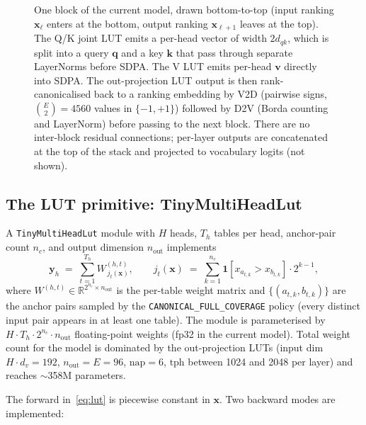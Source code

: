 \documentclass[11pt]{article}
\begin{document}
\begin{figure}[!t]
\caption{One block of the current model, drawn bottom-to-top (input ranking $\mathbf{x}_\ell$ enters at the bottom, output ranking $\mathbf{x}_{\ell+1}$ leaves at the top). The Q/K joint LUT emits a per-head vector of width $2 d_{qk}$, which is split into a query $\mathbf{q}$ and a key $\mathbf{k}$ that pass through separate LayerNorms before SDPA. The V LUT emits per-head $\mathbf{v}$ directly into SDPA. The out-projection LUT output is then rank-canonicalised back to a ranking embedding by V2D (pairwise signs, $\binom{E}{2} = 4560$ values in $\{-1, +1\}$) followed by D2V (Borda counting and LayerNorm) before passing to the next block. There are no inter-block residual connections; per-layer outputs are concatenated at the top of the stack and projected to vocabulary logits (not shown).}
\label{fig:block}
\end{figure}

\subsection{The LUT primitive: TinyMultiHeadLut}
\label{sec:current:tinymhl}

A \texttt{TinyMultiHeadLut} module with $H$ heads, $T_h$ tables per head, anchor-pair count $n_c$, and output dimension $n_{\text{out}}$ implements
\begin{equation}
    \mathbf{y}_h \;=\; \sum_{t=1}^{T_h} W^{(h, t)}_{\, j_t(\mathbf{x})}, \qquad
    j_t(\mathbf{x}) \;=\; \sum_{k=1}^{n_c} \mathbf{1}[x_{a_{t,k}} > x_{b_{t,k}}] \cdot 2^{k-1},
    \label{eq:lut}
\end{equation}
where $W^{(h, t)} \in \mathbb{R}^{2^{n_c} \times n_{\text{out}}}$ is the per-table weight matrix and $\{(a_{t,k}, b_{t,k})\}$ are the anchor pairs sampled by the \texttt{CANONICAL\_FULL\_COVERAGE} policy (every distinct input pair appears in at least one table).
The module is parameterised by $H \cdot T_h \cdot 2^{n_c} \cdot n_{\text{out}}$ floating-point weights (fp32 in the current model).
Total weight count for the model is dominated by the out-projection LUTs (input dim $H \cdot d_v = 192$, $n_{\text{out}} = E = 96$, $\text{nap} = 6$, $\text{tph}$ between 1024 and 2048 per layer) and reaches $\sim$358M parameters.

The forward in~\eqref{eq:lut} is piecewise constant in $\mathbf{x}$.
Two backward modes are implemented:
\end{document}
